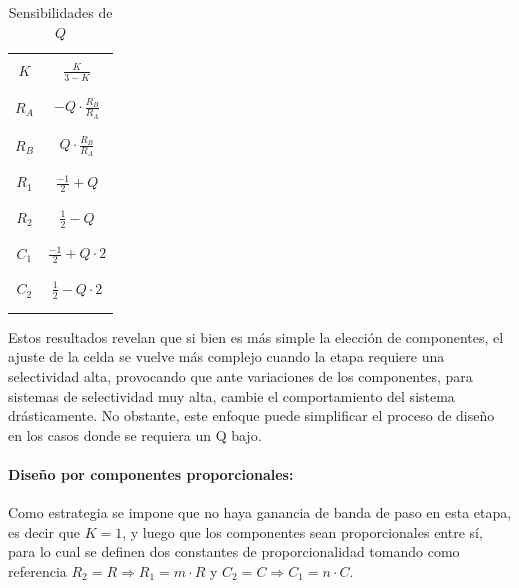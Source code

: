 \begin{table}[H]
    \centering
    \begin{tabular}{c | c}
        \hline \\
        $K$ & $\frac{K}{3 - K}$ \\
        \\ \hline \\
        $R_A$ & $-Q \cdot \frac{R_B}{R_A}$ \\
        \\ \hline \\
        $R_B$ & $Q \cdot \frac{R_B}{R_A}$ \\
        \\ \hline \\
        $R_1$ & $\frac{-1}{2} + Q$ \\
        \\ \hline \\
        $R_2$ & $\frac{1}{2} - Q$ \\
        \\ \hline \\
        $C_1$ & $\frac{-1}{2} + Q \cdot 2$ \\
        \\ \hline \\
        $C_2$ & $\frac{1}{2} - Q \cdot 2$ \\
        \\ \hline \\
    \end{tabular}
    \caption{Sensibilidades de $Q$}
\end{table}

Estos resultados revelan que si bien es m\'as simple la elecci\'on de componentes, el ajuste de la celda se vuelve m\'as complejo cuando la etapa requiere una selectividad alta,
provocando que ante variaciones de los componentes, para sistemas de selectividad muy alta, cambie el comportamiento del sistema dr\'asticamente. No obstante, este enfoque puede simplificar
el proceso de dise\~no en los casos donde se requiera un Q bajo.

\paragraph{Dise\~no por componentes proporcionales:} Como estrategia se impone que no haya ganancia de banda de paso en esta etapa, es decir que $K = 1$, y luego que los componentes sean proporcionales
entre s\'i, para lo cual se definen dos constantes de proporcionalidad tomando como referencia $R_2 = R \Rightarrow R_1 = m \cdot R$ y $C_2 = C \Rightarrow C_1 = n \cdot C$.

